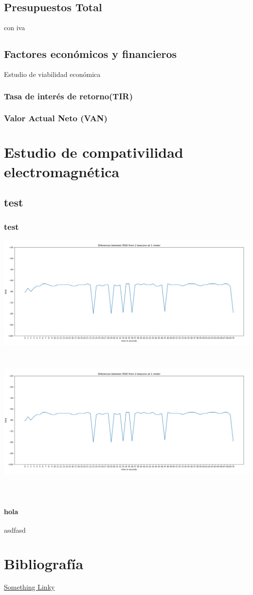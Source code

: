\documentclass[a4paper ,12pt, onecolumn]{article}
\begin{document}
    \subsection{Presupuestos Total}
        con iva
    \subsection{Factores económicos y financieros}
    Estudio de viabilidad económica
        \subsubsection{Tasa de interés de retorno(TIR)}
        \subsubsection{Valor Actual Neto (VAN)}

\section{Estudio de compativilidad electromagnética}
\subsection{test}
\subsubsection{test}

\includegraphics[scale=0.3]{5min_beacon_rssi}
\includegraphics[width=15cm, height=8cm]{5min_beacon_rssi}
\paragraph{hola}
asdfasd



\section{Bibliografía}
\href{https://campus.masterd.es/campusvirtual/index.htm}{Something Linky} 
\end{document}
